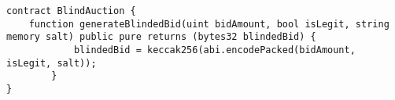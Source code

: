 \begin{lstlisting}[language=Solidity]
contract BlindAuction {
	function generateBlindedBid(uint bidAmount, bool isLegit, string memory salt) public pure returns (bytes32 blindedBid) {
			blindedBid = keccak256(abi.encodePacked(bidAmount, isLegit, salt));
		}
}
\end{lstlisting}